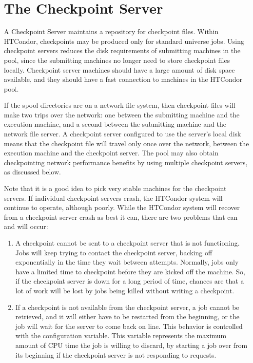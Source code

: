 \section{ The Checkpoint Server}\label{sec:Ckpt-Server}

A Checkpoint Server maintains a repository for checkpoint files.
Within HTCondor, checkpoints may be produced only for standard universe jobs.
Using checkpoint servers reduces the disk requirements of submitting
machines in the pool, since the submitting machines no longer need to
store checkpoint files locally.
Checkpoint server machines should have a large amount of disk space
available, and they should have a fast connection to machines
in the HTCondor pool.

If the spool directories are on a network file system, then
checkpoint files will make two trips over the network: one between the
submitting machine and the execution machine, and a second between the
submitting machine and the network file server.
A checkpoint server configured to use the server's local disk
means that the checkpoint file will travel only once over the
network, between the execution machine and the checkpoint server.
The pool may also obtain checkpointing network performance benefits by
using multiple checkpoint servers, as discussed below.

Note that it is a good idea to pick very stable machines for the checkpoint
servers.
If individual checkpoint servers crash, the HTCondor system will continue to
operate, although poorly.  
While the HTCondor system will recover from a checkpoint server crash
as best it can, there are two problems that can and will occur:
\begin{enumerate}

\item A checkpoint cannot be sent to a checkpoint server that
is not functioning.
Jobs will keep trying to contact the checkpoint server, backing
off exponentially in the time they wait between attempts.
Normally, jobs only have a limited time to checkpoint before they are
kicked off the machine.
So, if the checkpoint server is down for a long period of time,
chances are that a lot of work will be lost by jobs being killed 
without writing a checkpoint. 

\item If a checkpoint is not available from the checkpoint server,
a job cannot be retrieved, and it will either have to be restarted from
the beginning, or the job will wait for the server to come back on line.
This behavior is controlled with the
 configuration variable.
This variable represents the maximum amount of CPU time the job is
willing to discard, by starting a job over from its beginning if the
checkpoint server is not responding to requests.

\end{enumerate}

